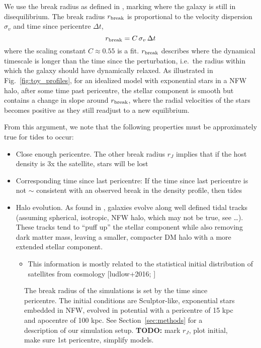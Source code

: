 We use the break radius as defined in \citet{penarrubia+2009}, marking
where the galaxy is still in disequilibrium. The break radius
\(r_{\rm break}\) is proportional to the velocity dispersion
\(\sigma_v\) and time since pericentre \(\Delta t\), \begin{equation}{
r_{\rm break} = C\,\sigma_{v}\,\Delta t
}\end{equation} where the scaling constant \(C \approx 0.55\) is a fit.
\(r_{\rm break}\) describes where the dynamical timescale is longer than
the time since the perturbation, i.e.~the radius within which the galaxy
should have dynamically relaxed. As illustrated in
Fig.~\ref{fig:toy_profiles}, for an idealized model with exponential
stars in a NFW halo, after some time past pericentre, the stellar
component is smooth but contains a change in slope around
\(r_{\rm break}\), where the radial velocities of the stars becomes
positive as they still readjust to a new equilibrium.

From this argument, we note that the following properties must be
approximately true for tides to occur:

\begin{itemize}
\tightlist
\item
  Close enough pericentre. The other break radius \(r_J\) implies that
  if the host density is 3x the satellite, stars will be lost
\item
  Corresponding time since last pericentre: If the time since last
  pericentre is not \(\sim\) consistent with an observed break in the
  density profile, then tides
\item
  Halo evolution. As found in \citet{EN2021}, galaxies evolve along well
  defined tidal tracks (assuming spherical, isotropic, NFW halo, which
  may not be true, see \ldots). These tracks tend to ``puff up'' the
  stellar component while also removing dark matter mass, leaving a
  smaller, compacter DM halo with a more extended stellar component.

  \begin{itemize}
  \tightlist
  \item
    This information is mostly related to the statistical initial
    distribution of satellites from cosmology {[}ludlow+2016;
    \citet{fattahi+2018}{]}
  \end{itemize}
\end{itemize}

\begin{figure}
\centering
{}
\caption[Break radius validation]{The break radius of the simulations is
set by the time since pericentre. The initial conditions are
Sculptor-like, exponential stars embedded in NFW, evolved in
\citet{EP2020} potential with a pericentre of 15 kpc and apocentre of
100 kpc. See Section~\ref{sec:methods} for a description of our
simulation setup. \textbf{TODO:} mark \(r_J\), plot initial, make sure
1st pericentre, simplify models.}\label{fig:idealized_break_radius}
\end{figure}

